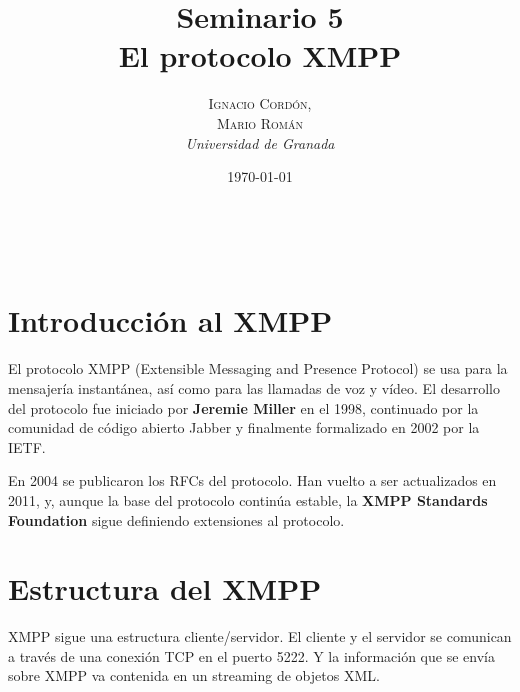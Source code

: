 \documentclass[a4paper, 11pt]{article} %
\title{\textbf{Seminario 5}\\ %
El protocolo XMPP} %
\author{\textsc{Ignacio Cordón,\\Mario Román} %
\\{\textit{Universidad de Granada}}} %
\date{\today} %
\makeatletter
\renewcommand{\maketitle}{ %
\begin{flushright} %
    {\LARGE\@title} %
    
    \vspace{50pt} %
    
    {\large\@author} %
    \\\@date %
    
    \vspace{40pt} %
\end{flushright}
}
\makeatother
\begin{document}
\maketitle %



\renewcommand{\abstractname}{Resumen} %
\begin{abstract}
\end{abstract}
{\parskip=2pt
\tableofcontents
}
\pagebreak



\section{Introducción al XMPP}
  El protocolo XMPP (Extensible Messaging and Presence Protocol) se usa para la mensajería
  instantánea, así como para las llamadas de voz y vídeo. El desarrollo del protocolo fue
  iniciado por \textbf{Jeremie Miller} en el 1998, continuado por la comunidad de código abierto Jabber
  y finalmente formalizado en 2002 por la IETF.
  
  En 2004 se publicaron los RFCs del protocolo. Han vuelto a ser actualizados en 2011, y, aunque
  la base del protocolo continúa estable, la \textbf{XMPP Standards Foundation} sigue definiendo extensiones
  al protocolo.

% 

\section{Estructura del XMPP}
  XMPP sigue una estructura cliente/servidor. El cliente y el servidor se comunican a través 
  de una conexión TCP en el puerto 5222. Y la información que se envía sobre XMPP va contenida
  en un streaming de objetos XML.
  
\end{document}
